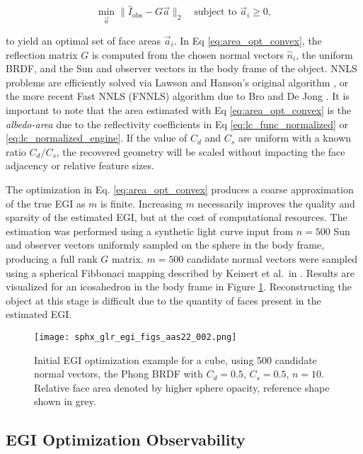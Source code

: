 \begin{equation} \label{eq:area_opt_convex}
  \min_{\vec{a}}{\|\hat{I}_{\textrm{obs}} - G \vec{a}\|_2} \:\:\: \textrm{ subject to } \vec{a}_i \geq 0,
\end{equation}

to yield an optimal set of face areas $\vec{a}_i$. In Eq \ref{eq:area_opt_convex}, the reflection matrix $G$ is computed from the chosen normal vectors $\hat{n}_i$, the uniform BRDF, and the Sun and observer vectors in the body frame of the object. NNLS problems are efficiently solved via Lawson and Hanson's original algorithm \cite{lawson1976}, or the more recent Fast NNLS (FNNLS) algorithm due to Bro and De Jong \cite{bro1996}. It is important to note that the area estimated with Eq \ref{eq:area_opt_convex} is the \textit{albedo-area} due to the reflectivity coefficients in Eq \ref{eq:lc_func_normalized} or \ref{eq:lc_normalized_engine}. If the value of $C_d$ and $C_s$ are uniform with a known ratio $C_d / C_s$, the recovered geometry will be scaled without impacting the face adjacency or relative feature sizes.

The optimization in Eq. \ref{eq:area_opt_convex} produces a coarse approximation of the true EGI as $m$ is finite. Increasing $m$ necessarily improves the quality and sparsity of the estimated EGI, but at the cost of computational resources. The estimation was performed using a synthetic light curve input from $n=500$ Sun and observer vectors uniformly sampled on the sphere in the body frame, producing a full rank $G$ matrix. $m = 500$ candidate normal vectors were sampled using a spherical Fibbonaci mapping described by Keinert et al.\ in \cite{keinert2015}. Results are visualized for an icosahedron in the body frame in Figure \ref{fig:initial_egi_sampling}. Reconstructing the object at this stage is difficult due to the quantity of faces present in the estimated EGI. 

\graphicspath{{/Users/liamrobinson/Documents/PyLightCurves/docs/build/html/_images}}
\begin{figure}[!htb]
  \centering
  \texttt{[image: sphx\_glr\_egi\_figs\_aas22\_002.png]}
  \caption{Initial EGI optimization example for a cube, using 500 candidate normal vectors, the Phong BRDF with $C_d=0.5$, $C_s=0.5$, $n=10$. Relative face area denoted by higher sphere opacity, reference shape shown in grey.}
  \label{fig:initial_egi_sampling}
\end{figure}

\subsection{EGI Optimization Observability}

